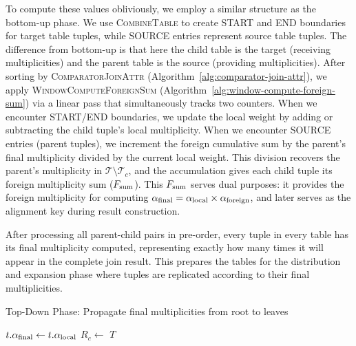 To compute these values obliviously, we employ a similar structure as the bottom-up phase. We use \textsc{CombineTable} to create START and END boundaries for target table tuples, while SOURCE entries represent source table tuples. The difference from bottom-up is that here the child table is the target (receiving multiplicities) and the parent table is the source (providing multiplicities). After sorting by \textsc{ComparatorJoinAttr} (Algorithm~\ref{alg:comparator-join-attr}), we apply \textsc{WindowComputeForeignSum} (Algorithm~\ref{alg:window-compute-foreign-sum}) via a linear pass that simultaneously tracks two counters. When we encounter START/END boundaries, we update the local weight by adding or subtracting the child tuple's local multiplicity. When we encounter SOURCE entries (parent tuples), we increment the foreign cumulative sum by the parent's final multiplicity divided by the current local weight. This division recovers the parent's multiplicity in $\mathcal{T} \setminus \mathcal{T}_c$, and the accumulation gives each child tuple its foreign multiplicity sum ($F_{\text{sum}}$). This $F_{\text{sum}}$ serves dual purposes: it provides the foreign multiplicity for computing $\alpha_{\text{final}} = \alpha_{\text{local}} \times \alpha_{\text{foreign}}$, and later serves as the alignment key during result construction.

After processing all parent-child pairs in pre-order, every tuple in every table has its final multiplicity computed, representing exactly how many times it will appear in the complete join result. This prepares the tables for the distribution and expansion phase where tuples are replicated according to their final multiplicities.

\begin{algorithm}[H]
\caption{Top-Down Phase: Propagate final multiplicities from root to leaves}
\label{alg:top-down}
\begin{algorithmic}[1]
        \State $t.\alpha_{\text{final}} \leftarrow t.\alpha_{\text{local}}$ 
    \EndFor
            \State $R_c \leftarrow$ 
        \EndFor
    \EndFor
    \State \Return $T$ 
\EndFunction
\end{algorithmic}
\end{algorithm}

